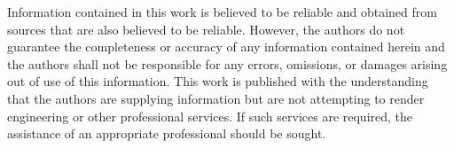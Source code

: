{\scriptsize \baselineskip=6pt \noindent Information contained in
this work is believed to be reliable and obtained from sources
that are also believed to be reliable. However, the authors do not
guarantee the completeness or accuracy of any information
contained herein and the authors shall not be responsible for any
errors, omissions, or damages arising out of use of this
information. This work is published with the understanding that
the authors are supplying information but are not attempting to
render engineering or other professional services. If such
services are required, the assistance of an appropriate
professional should be sought.} \hspace*{\fill} \tableofcontents
\normalsize
%
